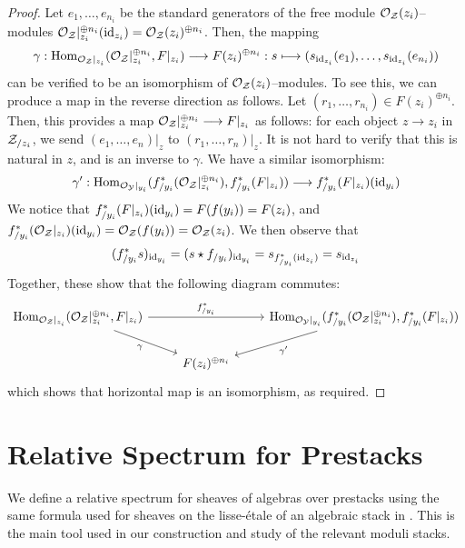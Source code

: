 \documentclass[11pt]{amsart}
\begin{document}
\begin{proof}
Let $e_1, \dots, e_{n_i}$ be the standard generators of the free module
$\mathcal{O}_{\mathcal{Z}}(z_i)$--modules
$\mathcal{O}_{\mathcal{Z}}|_{z_i}^{\oplus n_i}(\mathrm{id}_{z_i}) = \mathcal{O}_\mathcal{Z}(z_i)^{\oplus n_i}$.
Then, the mapping
\[
\gamma : \Hom_{\mcO_\mcZ|_{z_i}}(\mcO_\mcZ|_{z_i}^{\oplus n_i}, F|_{z_i})
    \to F(z_i)^{\oplus n_i} :
s \mapsto (s_{\id_{z_i}}(e_1), \dots, s_{\id_{z_i}}(e_{n_i}))
\]
can be verified to be an isomorphism of $\mathcal{O}_{\mathcal{Z}}(z_i)$--modules. To
see this, we can produce a map in the reverse direction as follows.
Let $(r_1, \dots, r_{n_i}) \in F(z_i)^{\oplus n_i}$. Then, this provides
a map $\mcO_\mcZ|_{z_i}^{\oplus n_i} \to F|_{z_i}$ as follows: for each
object $z \to z_i$ in $\mathcal{Z}_{/z_i}$, we send
$(e_1, \dots, e_n)|_z$ to $(r_1, \dots, r_n)|_z$.
It is not hard to verify that this is natural in $z$, and is an
inverse to $\gamma$. We have a similar isomorphism:
\[
\gamma' :
\Hom_{\mcO_\mcY|_{y_i}}(f^*_{/y_i}(\mcO_\mcZ|_{z_i}^{\oplus n_i}),
    f_{/y_i}^*(F|_{z_i})) \to
f^*_{/y_i}(F|_{z_i})(\id_{y_i})
\]
We notice that $f^*_{/y_i}(F|_{z_i})(\mathrm{id}_{y_i}) = F(f(y_i)) = F(z_i)$,
and $f^*_{/y_i}(\mathcal{O}_\mathcal{Z}|_{z_i})(\mathrm{id}_{y_i}) = \mathcal{O}_\mathcal{Z}(f(y_i))
= \mathcal{O}_\mathcal{Z}(z_i)$.
We then observe that
\[
(f_{/y_i}^*s)_{\mathrm{id}_{y_i}}
= (s \star f_{/y_i})_{\mathrm{id}_{y_i}}
= s_{f_{/y_i}^*(\mathrm{id}_{z_i})}
= s_{\mathrm{id}_{z_i}}
\]
Together, these show that the following diagram commutes:
\[\begin{tikzcd}
\Hom_{\mcO_\mcZ|_{z_i}}(\mcO_\mcZ|_{z_i}^{\oplus n_i}, F|_{z_i})
    \ar[rr, "f_{/y_i}^*" above]
    \ar[rd, "\gamma" below left] & &
\Hom_{\mcO_\mcY|_{y_i}}(f^*_{/y_i}(\mcO_\mcZ|_{z_i}^{\oplus n_i}),
        f_{/y_i}^*(F|_{z_i}))
    \ar[ld, "\gamma'" below right] \\ &
F(z_i)^{\oplus n_i} &
\end{tikzcd}\]
which shows that horizontal map is an isomorphism, as required.
\end{proof}


\section{Relative Spectrum for Prestacks}\label{sec:RelSpec}

We define a relative spectrum for sheaves of algebras over prestacks using the
same formula used for sheaves on the lisse-\'etale of an algebraic stack
in \cite[\S 10.2.1]{AG-Olsson}. This is the main tool used in our construction
and study of the relevant moduli stacks.
\end{document}
